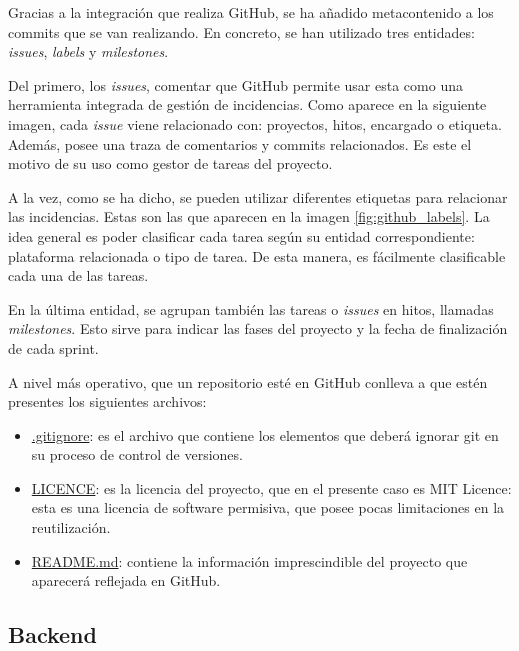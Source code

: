 Gracias a la integración que realiza GitHub, se ha añadido metacontenido a los commits que se van realizando. En concreto, se han utilizado tres entidades: \textit{issues}, \textit{labels} y \textit{milestones}.


Del primero, los \textit{issues}, comentar que GitHub permite usar esta como una herramienta integrada de gestión de incidencias. Como aparece en la siguiente imagen, cada \textit{issue} viene relacionado con: proyectos, hitos, encargado o etiqueta. Además, posee una traza de comentarios y commits relacionados. Es este el motivo de su uso como gestor de tareas del proyecto.


A la vez, como se ha dicho, se pueden utilizar diferentes etiquetas para relacionar las incidencias. Estas son las que aparecen en la imagen \ref{fig:github_labels}. La idea general es poder clasificar cada tarea según su entidad correspondiente: plataforma relacionada o tipo de tarea. De esta manera, es fácilmente clasificable cada una de las tareas.


En la última entidad, se agrupan también las tareas o \textit{issues} en hitos, llamadas \textit{milestones}. Esto sirve para indicar las fases del proyecto y la fecha de finalización de cada sprint.

A nivel más operativo, que un repositorio esté en GitHub conlleva a que estén presentes los siguientes archivos:

\begin{itemize}
    \item \underline{.gitignore}: es el archivo que contiene los elementos que deberá ignorar git en su proceso de control de versiones.
    \item \underline{LICENCE}: es la licencia del proyecto, que en el presente caso es MIT Licence: esta es una licencia de software permisiva, que posee pocas limitaciones en la reutilización.
    \item \underline{README.md}: contiene la información imprescindible del proyecto que aparecerá reflejada en GitHub.
\end{itemize}

\subsection{Backend}

